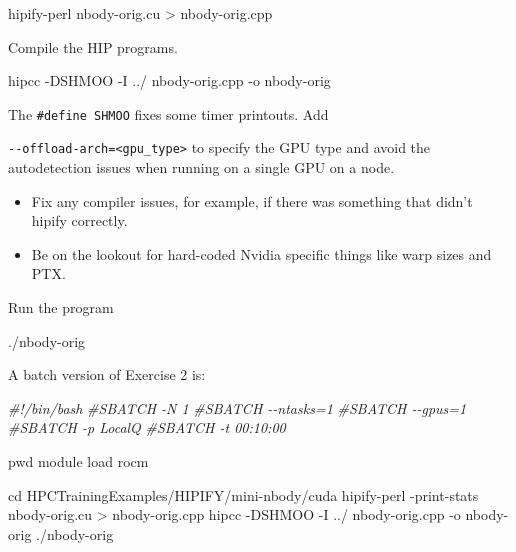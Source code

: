 \documentclass[
]{article}
\providecommand{\tightlist}{%
  \setlength{\itemsep}{0pt}\setlength{\parskip}{0pt}}
\let\oldtexttt\texttt
\renewcommand{\texttt}[1]{
  \colorbox{Light}{\oldtexttt{#1}}
}
\newenvironment{Shaded}{}{}
\newcommand{\BuiltInTok}[1]{#1}
\newcommand{\CommentTok}[1]{\textcolor[rgb]{0.38,0.63,0.69}{\textit{#1}}}
\newcommand{\ExtensionTok}[1]{#1}
\newcommand{\NormalTok}[1]{#1}
\newcommand{\OperatorTok}[1]{\textcolor[rgb]{0.40,0.40,0.40}{#1}}
\providecommand{\tightlist}{%
  \setlength{\itemsep}{0pt}\setlength{\parskip}{0pt}}
\begin{document}
\begin{Shaded}
\begin{Highlighting}[]
\ExtensionTok{hipify{-}perl}\NormalTok{ nbody{-}orig.cu }\OperatorTok{\textgreater{}}\NormalTok{ nbody{-}orig.cpp}
\end{Highlighting}
\end{Shaded}

Compile the HIP programs.

\begin{Shaded}
\begin{Highlighting}[]
\ExtensionTok{hipcc}\NormalTok{ {-}DSHMOO {-}I ../ nbody{-}orig.cpp {-}o nbody{-}orig}
\end{Highlighting}
\end{Shaded}

The \texttt{\#define\ SHMOO} fixes some timer printouts. Add
\texttt{-\/-offload-arch=\textless{}gpu\_type\textgreater{}} to specify
the GPU type and avoid the autodetection issues when running on a single
GPU on a node.

\begin{itemize}
\tightlist
\item
  Fix any compiler issues, for example, if there was something that
  didn't hipify correctly.
\item
  Be on the lookout for hard-coded Nvidia specific things like warp
  sizes and PTX.
\end{itemize}

Run the program

\begin{Shaded}
\begin{Highlighting}[]
\ExtensionTok{./nbody{-}orig}
\end{Highlighting}
\end{Shaded}

A batch version of Exercise 2 is:

\begin{Shaded}
\begin{Highlighting}[]
\CommentTok{\#!/bin/bash}
\CommentTok{\#SBATCH {-}N 1}
\CommentTok{\#SBATCH {-}{-}ntasks=1}
\CommentTok{\#SBATCH {-}{-}gpus=1}
\CommentTok{\#SBATCH {-}p LocalQ}
\CommentTok{\#SBATCH {-}t 00:10:00}

\BuiltInTok{pwd}
\ExtensionTok{module}\NormalTok{ load rocm}

\BuiltInTok{cd}\NormalTok{ HPCTrainingExamples/HIPIFY/mini{-}nbody/cuda}
\ExtensionTok{hipify{-}perl}\NormalTok{ {-}print{-}stats nbody{-}orig.cu }\OperatorTok{\textgreater{}}\NormalTok{ nbody{-}orig.cpp}
\ExtensionTok{hipcc}\NormalTok{ {-}DSHMOO {-}I ../ nbody{-}orig.cpp {-}o nbody{-}orig}
\ExtensionTok{./nbody{-}orig}
\end{Highlighting}
\end{Shaded}
\end{document}
